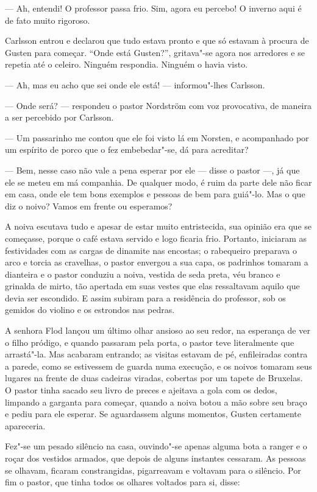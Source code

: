 --- Ah, entendi! O professor passa frio. Sim, agora eu percebo! O inverno aqui é
de fato muito rigoroso.

Carlsson entrou e declarou que tudo estava pronto e que só estavam à procura de
Gusten para começar. ``Onde está Gusten?'', gritava"-se agora nos arredores e se
repetia até o celeiro. Ninguém respondia. Ninguém o havia visto.

--- Ah, mas eu acho que sei onde ele está! --- informou"-lhes Carlsson.

--- Onde será? --- respondeu o pastor Nordström com voz provocativa, de maneira a
ser percebido por Carlsson.

--- Um passarinho me contou que ele foi visto lá em Norsten, e acompanhado por um
espírito de porco que o fez embebedar"-se, dá para acreditar?

--- Bem, nesse caso não vale a pena esperar por ele --- disse o pastor ---, já que ele se
meteu em má companhia. De qualquer modo, é ruim da parte dele não ficar em casa,
onde ele tem bons exemplos e pessoas de bem para guiá"-lo. Mas o que diz o noivo?
Vamos em frente ou esperamos?

A noiva escutava tudo e apesar de estar muito entristecida, sua opinião era
que se começasse, porque o café estava servido e logo ficaria frio. Portanto,
iniciaram as festividades com as cargas de dinamite nas encostas; o rabequeiro
preparava o arco e torcia as cravelhas, o pastor envergou a sua capa, os
padrinhos tomaram a dianteira e o pastor conduziu a noiva, vestida de seda
preta, véu branco e grinalda de mirto, tão apertada em suas vestes que elas
ressaltavam aquilo que devia ser escondido. E assim subiram para a residência do
professor, sob os gemidos do violino e os estrondos nas pedras.

A senhora Flod lançou um último olhar ansioso ao seu redor, na esperança de ver
o filho pródigo, e quando passaram pela porta, o pastor teve literalmente que arrastá"-la. 
Mas acabaram entrando; as visitas estavam de pé, enfileiradas contra 
a parede, como se estivessem de guarda numa execução, e os noivos
tomaram seus lugares na frente de duas cadeiras viradas, cobertas por um tapete
de Bruxelas. O pastor tinha sacado seu livro de preces e ajeitava a gola com os dedos,
limpando a garganta para começar, quando a noiva botou a mão sobre seu braço e
pediu para ele esperar. Se aguardassem alguns momentos, Gusten certamente apareceria.

Fez"-se um pesado silêncio na casa, ouvindo"-se apenas alguma bota a ranger e o roçar
dos vestidos armados, que depois de alguns instantes cessaram. As pessoas se
olhavam, ficaram constrangidas, pigarreavam e voltavam para o silêncio. Por fim
o pastor, que tinha todos os olhares voltados para si, disse:

